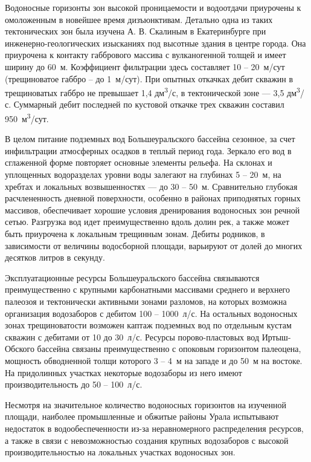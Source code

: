 Водоносные горизонты зон высокой проницаемости и водоотдачи приурочены к омоложенным в новейшее время дизъюнктивам. Детально одна из таких тектонических зон была изучена А. В. Скалиным в Екатеринбурге
при инженерно-геологических изысканиях под высотные здания в центре города. Она приурочена к контакту габбрового массива с вулканогенной толщей и имеет ширину до 60~м. Коэффициент фильтрации здесь составляет 10  --  20~м/сут (трещиноватое габбро  --  до 1~м/сут). При опытных откачках дебит скважин в трещиноватых габбро не превышает 1,4 дм\textsuperscript{3}/с, в тектонической зоне  ---  3,5 дм\textsuperscript{3}/с. Суммарный дебит последней по кустовой откачке трех скважин составил 950~м\textsuperscript{3}/сут.

В целом питание подземных вод Большеуральского бассейна сезонное, за счет инфильтрации атмосферных осадков в теплый период года. Зеркало его вод в сглаженной форме повторяет основные элементы рельефа. На склонах и уплощенных водоразделах уровни воды залегают на глубинах 5  --  20~м, на хребтах и локальных возвышенностях  ---  до 30  --  50~м. Сравнительно глубокая расчлененность дневной поверхности, особенно в районах приподнятых горных массивов, обеспечивает хорошие условия дренирования водоносных зон речной сетью. Разгрузка вод идет преимущественно вдоль долин рек, а также может быть приурочена к локальным трещинным зонам. Дебиты родников, в зависимости от величины водосборной площади, варьируют от долей до многих десятков литров в секунду.

Эксплуатационные ресурсы Большеуральского бассейна связываются преимущественно с крупными карбонатными массивами среднего и верхнего палеозоя и тектонически активными зонами разломов, на которых возможна организация водозаборов с дебитом 100  --  1000~л/с. На остальных водоносных зонах трещиноватости возможен каптаж подземных вод по отдельным кустам скважин с дебитами от 10 до 30~л/с. Ресурсы порово-пластовых вод Иртыш-Обского бассейна связаны преимущественно с опоковым горизонтом палеоцена, мощность обводненной толщи которого 3  --  4~м на западе и до 50~м на востоке. На придолинных участках некоторые водозаборы из него имеют производительность до 50 -- 100~л/с.

Несмотря на значительное количество водоносных горизонтов на изученной площади, наиболее промышленные и обжитые районы Урала испытывают недостаток в водообеспеченности из-за неравномерного распределения ресурсов, а также в связи с невозможностью создания крупных водозаборов с высокой производительностью на локальных участках водоносных зон.
